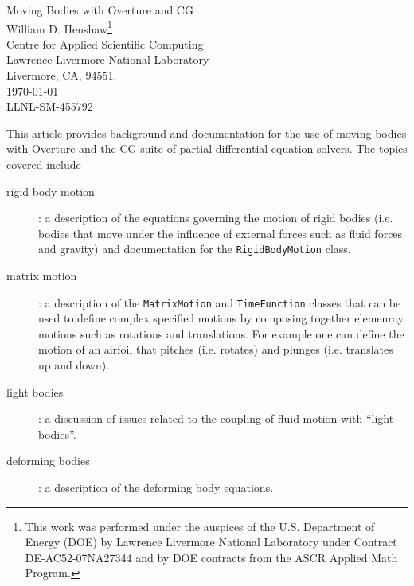 \documentclass[11pt]{article}
\begin{document}
\baselineskip
\begin{flushleft}
{\Large Moving Bodies with Overture and CG} \\
\vspace{2\baselineskip}
William D. Henshaw\footnote{This work was performed under the auspices of the U.S. Department of Energy (DOE) by
Lawrence Livermore National Laboratory under Contract DE-AC52-07NA27344 and by 
DOE contracts from the ASCR Applied Math Program.}  \\
Centre for Applied Scientific Computing  \\
Lawrence Livermore National Laboratory      \\
Livermore, CA, 94551.  \\
\vspace{\baselineskip}
\today\\
\vspace{\baselineskip}
LLNL-SM-455792

\vspace{4\baselineskip}

 This article provides background and documentation for
the use of moving bodies with Overture and the CG suite of partial differential
equation solvers. The topics covered include
\begin{description}
  \item[rigid body motion] : a description of the equations governing the motion of rigid bodies (i.e. bodies that move
     under the influence of external forces such as fluid forces and gravity) and documentation
      for the {\tt RigidBodyMotion} class.
  \item[matrix motion] : a description of the {\tt MatrixMotion} and {\tt TimeFunction} classes that can be used to
         define complex specified motions by composing together elemenray motions such as rotations and translations. For example
         one can define the motion of an airfoil that pitches (i.e. rotates) and plunges (i.e. translates
       up and down). 
  \item[light bodies] : a discussion of issues related to the coupling of fluid motion with ``light bodies''. 
  \item[deforming bodies] : a description of the deforming body equations.
\end{description}

\end{flushleft}
\end{document}
